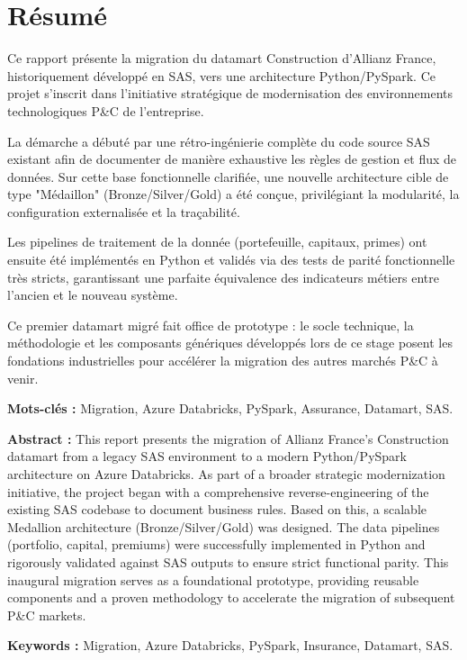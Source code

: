 \chapter*{Résumé}

Ce rapport présente la migration du datamart Construction d'Allianz France, historiquement développé en SAS, vers une architecture Python/PySpark. Ce projet s'inscrit dans l'initiative stratégique de modernisation des environnements technologiques P\&C de l'entreprise.

La démarche a débuté par une rétro-ingénierie complète du code source SAS existant afin de documenter de manière exhaustive les règles de gestion et flux de données. Sur cette base fonctionnelle clarifiée, une nouvelle architecture cible de type "Médaillon" (Bronze/Silver/Gold) a été conçue, privilégiant la modularité, la configuration externalisée et la traçabilité.

Les pipelines de traitement de la donnée (portefeuille, capitaux, primes) ont ensuite été implémentés en Python et validés via des tests de parité fonctionnelle très stricts, garantissant une parfaite équivalence des indicateurs métiers entre l'ancien et le nouveau système.

Ce premier datamart migré fait office de prototype : le socle technique, la méthodologie et les composants génériques développés lors de ce stage posent les fondations industrielles pour accélérer la migration des autres marchés P\&C à venir.

\vspace{1cm}
\textbf{Mots-clés :} Migration, Azure Databricks, PySpark, Assurance, Datamart, SAS.

\vspace{0.5cm}
\textbf{Abstract :} This report presents the migration of Allianz France's Construction datamart from a legacy SAS environment to a modern Python/PySpark architecture on Azure Databricks. As part of a broader strategic modernization initiative, the project began with a comprehensive reverse-engineering of the existing SAS codebase to document business rules. Based on this, a scalable Medallion architecture (Bronze/Silver/Gold) was designed. The data pipelines (portfolio, capital, premiums) were successfully implemented in Python and rigorously validated against SAS outputs to ensure strict functional parity. This inaugural migration serves as a foundational prototype, providing reusable components and a proven methodology to accelerate the migration of subsequent P\&C markets.

\vspace{0.5cm}
\textbf{Keywords :} Migration, Azure Databricks, PySpark, Insurance, Datamart, SAS.